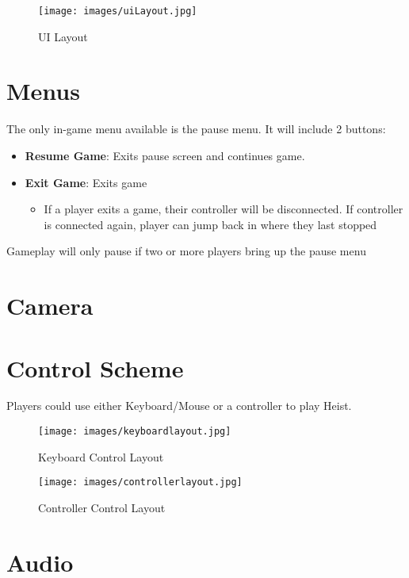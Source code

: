 \documentclass[14pt]{report}
\begin{document}
\begin{figure}[H]
	\texttt{[image: images/uiLayout.jpg]}
    \caption{UI Layout}
    \label{fig:uilayout}
\end{figure}

\section{Menus}

The only in-game menu available is the pause menu. It will include 2 buttons:

\begin{itemize}
    \item \textbf{Resume Game}: Exits pause screen and continues game.
    \item \textbf{Exit Game}: Exits game
    \begin{itemize}
        \item If a player exits a game, their controller will be disconnected. If controller is connected again, player can jump back in where they last stopped 
    \end{itemize}
\end{itemize}

Gameplay will only pause if two or more players bring up the pause menu


\section{Camera}


\section{Control Scheme}

Players could use either Keyboard/Mouse or a controller to play Heist.

\begin{figure}[H]
	\texttt{[image: images/keyboardlayout.jpg]}
    \caption{Keyboard Control Layout}
\end{figure}

\begin{figure}[H]
	\texttt{[image: images/controllerlayout.jpg]}
    \caption{Controller Control Layout}
\end{figure}

\section{Audio}
\end{document}
